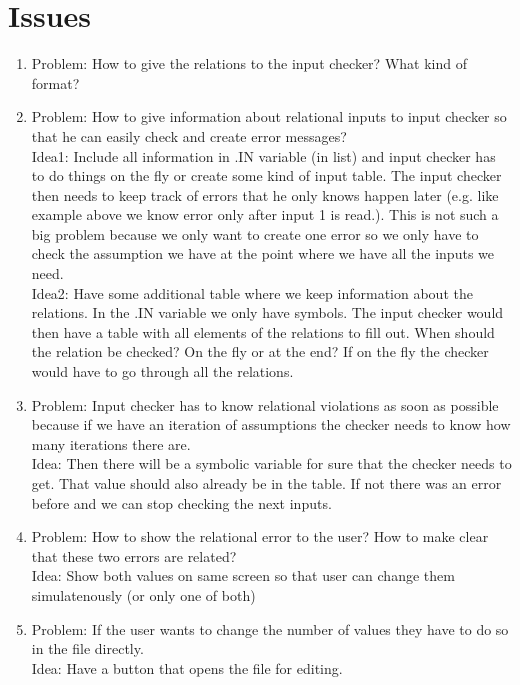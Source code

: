 \documentclass[11pt]{article}
\begin{document}
\section{Issues}

\begin{enumerate}
  \item Problem: How to give the relations to the input checker? What kind of format?
  \item Problem: How to give information about relational inputs to input checker so that he can easily check and create error messages?\\
  Idea1: Include all information in .IN variable (in list) and input checker has to do things on the fly or create some kind of input table. The input checker then needs to keep track of errors that he only knows happen later (e.g. like example above we know error only after input 1 is read.). This is not such a big problem because we only want to create one error so we only have to check the assumption we have at the point where we have all the inputs we need.\\
  Idea2: Have some additional table where we keep information about the relations. In the .IN variable we only have symbols. The input checker would then have a table with all elements of the relations to fill out. When should the relation be checked? On the fly or at the end? If on the fly the checker would have to go through all the relations.
  \item Problem: Input checker has to know relational violations as soon as possible because if we have an iteration of assumptions the checker needs to know how many iterations there are.\\
  Idea: Then there will be a symbolic variable for sure that the checker needs to get. That value should also already be in the table. If not there was an error before and we can stop checking the next inputs.
  \item Problem: How to show the relational error to the user? How to make clear that these two errors are related?\\
  Idea: Show both values on same screen so that user can change them simulatenously (or only one of both)
  \item Problem: If the user wants to change the number of values they have to do so in the file directly.\\
  Idea: Have a button that opens the file for editing.
\end{enumerate}
\end{document}
